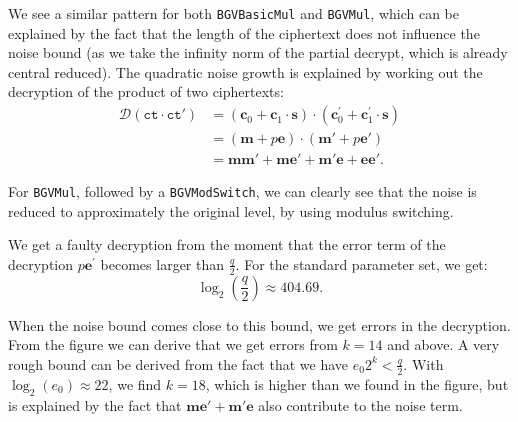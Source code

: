 \documentclass{article}
\begin{document}
We see a similar pattern for both \texttt{BGVBasicMul} and \texttt{BGVMul},
which can be explained by the fact that the length of the ciphertext does not
influence the noise bound (as we take the infinity norm of the partial decrypt,
which is already central reduced). The quadratic noise growth is explained by
working out the decryption of the product of two ciphertexts:
\begin{equation}
  \begin{split}
    \mathcal{D}\left( \texttt{ct} \cdot \texttt{ct}'\right) &= \left(
      \mathbf{c}_0 + \mathbf{c}_1
    \cdot \mathbf{s} \right) \cdot (\mathbf{c}_0^\prime + \mathbf{c}_1^\prime
    \cdot \mathbf{s}) \\
                                                            &= (\mathbf{m} + p
                                                            \mathbf{e}) \cdot
                                                            (\mathbf{m}' + p
                                                            \mathbf{e}') \\
                                                            &=
                                                            \mathbf{m}\mathbf{m}'
                                                            +
                                                            \mathbf{m}\mathbf{e}'
                                                            +
                                                            \mathbf{m}'\mathbf{e}
                                                            +
                                                            \mathbf{e}\mathbf{e}'.
  \end{split}
\end{equation} 

For \texttt{BGVMul}, followed by a
\texttt{BGVModSwitch}, we can clearly see that the noise is reduced to
approximately the original level, by using modulus switching.

\noindent We get a faulty decryption from the moment that the error term of the
decryption $p \mathbf{e}^\prime$ becomes larger than $\frac{q}{2}$. For the
standard parameter set, we get:
\begin{equation}
  \log_2\left(\frac{q}{2}\right) \approx 404.69.
\end{equation} 

When the noise bound comes close to this bound, we get errors in the decryption.
From the figure we can derive that we get errors from $k = 14$ and above. A very
rough bound can be derived from the fact that we have $e_0 2^k < \frac{q}{2}
$. With $\log_2(e_0) \approx 22$, we find $k = 18$, which is higher than we
found in the figure, but is explained by the fact that $\mathbf{m}\mathbf{e}' +
\mathbf{m}'\mathbf{e}$ also contribute to the noise term.
\end{document}

